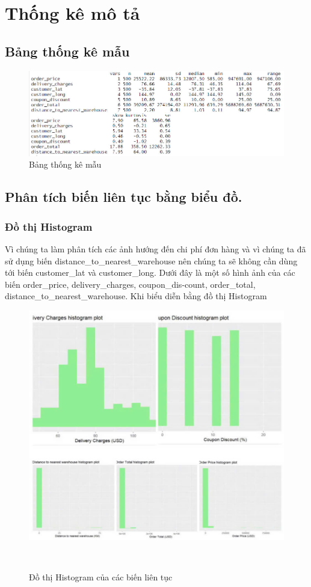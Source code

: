 \section{Thống kê mô tả}

\subsection{Bảng thống kê mẫu}
\begin{figure}[H]
    \centering
    \includegraphics[width=0.8\linewidth]{graphics/bảng thống kê mẫu.jpg}
    \caption{Bảng thống kê mẫu}
\end{figure}

\subsection{Phân tích biến liên tục bằng biểu đồ.}
\subsubsection{Đồ thị Histogram}
	Vì chúng ta làm phân tích các ảnh hướng đến chi phí đơn hàng và vì chúng ta đã sử dụng biến distance\_to\_nearest\_warehouse nên chúng ta sẽ không cần dùng tới biến customer\_lat và customer\_long. Dưới đây là một số hình ảnh của các biến order\_price, delivery\_charges, coupon\_dis-count, order\_total, distance\_to\_nearest\_warehouse. Khi biểu diễn bằng đồ thị Histogram
\begin{figure}[H]
    \centering
    \includegraphics[width=0.7\linewidth]{graphics/bang7.jpg}
    \caption{Đồ thị Histogram của các biến liên tục}\
    \label{asb}
\end{figure}
\FloatBarrier

